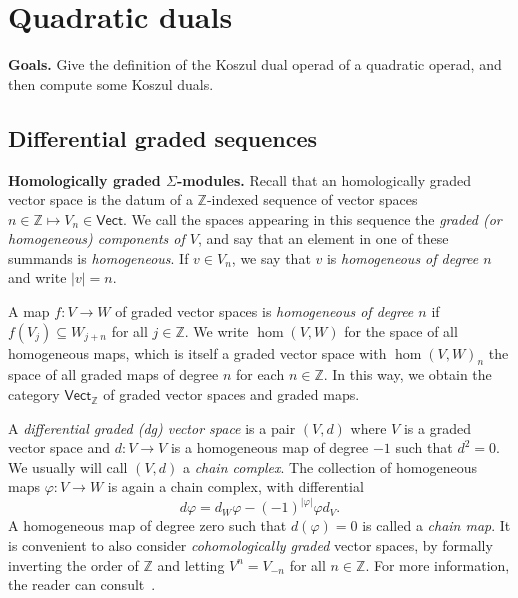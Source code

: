 
\section{Quadratic duals}\label{lecture:KD1}
\textbf{Goals.}
Give the definition of the Koszul dual
operad of a quadratic operad, and then compute
some Koszul duals.

\subsection{Differential graded sequences}


\textbf{Homologically graded $\Sigma$-modules.}
Recall that an homologically graded vector space is
the datum of a $\mathbb Z$-indexed sequence of vector
spaces $n\in\mathbb Z\longmapsto V_n\in\mathsf{Vect}$.
We call the spaces appearing in this sequence the \emph{graded (or
homogeneous) components of $V$}, and say that an element in 
one of these summands is \emph{homogeneous}. If
$v\in V_n$, we say that $v$ is \emph{homogeneous of
degree $n$} and write $|v|=n$. 

A map $f : V\longrightarrow W$ of graded vector spaces
is \emph{homogeneous of degree $n$} if $f(V_j)\subseteq W_{j+n}$ for
all $j\in \mathbb Z$. We write $\hom(V,W)$ for the
space of all homogeneous maps, which is itself a graded
vector space with $\hom(V,W)_n$ the space of all
graded maps of degree $n$ for each $n\in\mathbb Z$. 
In this way, we obtain the category $\mathsf{Vect}_\mathbb{Z}$
of graded vector spaces and graded maps. 

A \emph{differential graded (dg) vector space} is a pair 
$(V,d)$ where $V$ is a graded vector space and 
$d : V\longrightarrow V$ is a homogeneous map of degree 
$-1$ such that $d^2=0$. We usually will call $(V,d)$
a \emph{chain complex}. The collection of homogeneous
maps $\varphi:V\longrightarrow W$ is again a chain
complex, with differential
\[ d\varphi 
	= d_W\varphi - (-1)^{|\varphi|} \varphi d_V. \]
A homogeneous map of degree zero such that $d(\varphi)=0$
is called a \emph{chain map}.
It is
convenient to also consider \emph{cohomologically graded}
vector spaces, by formally inverting the order of $\mathbb{Z}$
and letting $V^n = V_{-n}$ for all $n\in\mathbb Z$. 
For more information, the reader can consult~\cite{Weibel1994,
Gelfand2003,Hilton1997,Cartan1956}.

\bigskip

